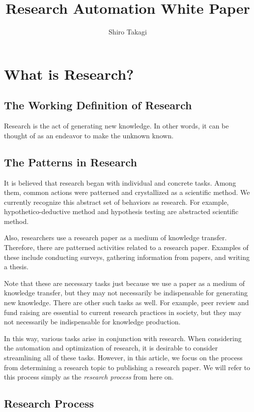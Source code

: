 \documentclass{article}
\title{Research Automation White Paper}
\author{Shiro Takagi}
\begin{document}
\maketitle

\section{What is Research?}

\subsection{The Working Definition of Research}
Research is the act of generating new knowledge. In other words, it can be thought of as an endeavor to make the unknown known.

\subsection{The Patterns in Research}

It is believed that research began with individual and concrete tasks. Among them, common actions were patterned and crystallized as a scientific method. We currently recognize this abstract set of behaviors as research. For example, hypothetico-deductive method and hypothesis testing are abstracted scientific method.

Also, researchers use a research paper as a medium of knowledge transfer. Therefore, there are patterned activities related to a research paper. Examples of these include conducting surveys, gathering information from papers, and writing a thesis.

Note that these are necessary tasks just because we use a paper as a medium of knowledge transfer, but they may not necessarily be indispensable for generating new knowledge. There are other such tasks as well. For example, peer review and fund raising are essential to current research practices in society, but they may not necessarily be indispensable for knowledge production.

In this way, various tasks arise in conjunction with research. When considering the automation and optimization of research, it is desirable to consider streamlining all of these tasks. However, in this article, we focus on the process from determining a research topic to publishing a research paper. We will refer to this process simply as the \textit{research process} from here on.

\subsection{Research Process}
\end{document}
